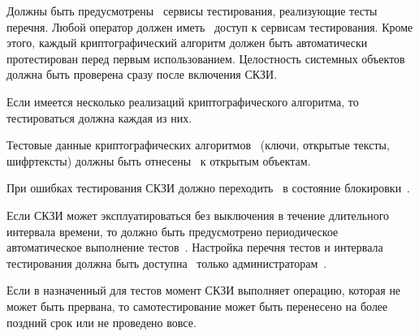 Должны быть предусмотрены~ сервисы тестирования, реализующие 
тесты перечня. Любой оператор должен иметь~ доступ к 
сервисам тестирования.
%
Кроме этого, каждый криптографический алгоритм должен быть автоматически 
протестирован перед первым использованием.
%
Целостность системных объектов должна быть проверена сразу после включения 
СКЗИ.

\begin{note*}
Если имеется несколько реализаций криптографического алгоритма,  
то тестироваться должна каждая из них.
\end{note*}

\label{R.ST.TestData} %
Тестовые данные криптографических алгоритмов~ 
(ключи, открытые тексты, шифртексты) 
должны быть отнесены~ к открытым объектам.

\label{R.ST.TestLock} %
При ошибках тестирования СКЗИ должно переходить~ 
в состояние блокировки~.


\label{R.ST.Periodic} %
Если СКЗИ может эксплуатироваться без выключения в течение длительного интервала
времени, то должно быть предусмотрено периодическое автоматическое выполнение 
тестов~. Настройка перечня тестов и интервала тестирования
должна быть доступна~ только 
администраторам~.

\begin{note*}
Если в назначенный для тестов момент СКЗИ выполняет операцию, которая не может 
быть прервана, то самотестирование может быть перенесено на более поздний срок
или не проведено вовсе.
%
\end{note*} 
